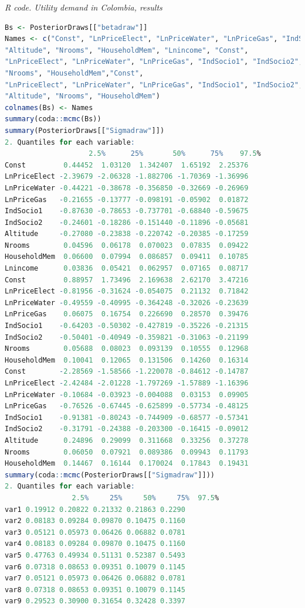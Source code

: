 \begin{tcolorbox}[enhanced,width=4.67in,center upper,
	fontupper=\large\bfseries,drop shadow southwest,sharp corners]
	\textit{R code. Utility demand in Colombia, results}
	\begin{VF}
		\begin{lstlisting}[language=R]
Bs <- PosteriorDraws[["betadraw"]]
Names <- c("Const", "LnPriceElect", "LnPriceWater", "LnPriceGas", "IndSocio1", "IndSocio2", 
"Altitude", "Nrooms", "HouseholdMem", "Lnincome", "Const",
"LnPriceElect", "LnPriceWater", "LnPriceGas", "IndSocio1", "IndSocio2", 
"Nrooms", "HouseholdMem","Const",
"LnPriceElect", "LnPriceWater", "LnPriceGas", "IndSocio1", "IndSocio2", 
"Altitude", "Nrooms", "HouseholdMem")
colnames(Bs) <- Names
summary(coda::mcmc(Bs))
summary(PosteriorDraws[["Sigmadraw"]])
2. Quantiles for each variable:
					2.5%      25%       50%      75%    97.5%
Const         0.44452  1.03120  1.342407  1.65192  2.25376
LnPriceElect -2.39679 -2.06328 -1.882706 -1.70369 -1.36996
LnPriceWater -0.44221 -0.38678 -0.356850 -0.32669 -0.26969
LnPriceGas   -0.21655 -0.13777 -0.098191 -0.05902  0.01872
IndSocio1    -0.87630 -0.78653 -0.737701 -0.68840 -0.59675
IndSocio2    -0.24601 -0.18286 -0.151440 -0.11896 -0.05681
Altitude     -0.27080 -0.23838 -0.220742 -0.20385 -0.17259
Nrooms        0.04596  0.06178  0.070023  0.07835  0.09422
HouseholdMem  0.06600  0.07994  0.086857  0.09411  0.10785
Lnincome      0.03836  0.05421  0.062957  0.07165  0.08717
Const         0.88957  1.73496  2.169638  2.62170  3.47216
LnPriceElect -0.81956 -0.31624 -0.054075  0.21132  0.71842
LnPriceWater -0.49559 -0.40995 -0.364248 -0.32026 -0.23639
LnPriceGas    0.06075  0.16754  0.226690  0.28570  0.39476
IndSocio1    -0.64203 -0.50302 -0.427819 -0.35226 -0.21315
IndSocio2    -0.50401 -0.40949 -0.359821 -0.31063 -0.21199
Nrooms        0.05688  0.08023  0.093139  0.10555  0.12968
HouseholdMem  0.10041  0.12065  0.131506  0.14260  0.16314
Const        -2.28569 -1.58566 -1.220078 -0.84612 -0.14787
LnPriceElect -2.42484 -2.01228 -1.797269 -1.57889 -1.16396
LnPriceWater -0.10684 -0.03923 -0.004088  0.03153  0.09905
LnPriceGas   -0.76526 -0.67445 -0.625899 -0.57734 -0.48125
IndSocio1    -0.91381 -0.80243 -0.744909 -0.68577 -0.57341
IndSocio2    -0.31791 -0.24388 -0.203300 -0.16415 -0.09012
Altitude      0.24896  0.29099  0.311668  0.33256  0.37278
Nrooms        0.06050  0.07921  0.089386  0.09943  0.11793
HouseholdMem  0.14467  0.16144  0.170024  0.17843  0.19431
summary(coda::mcmc(PosteriorDraws[["Sigmadraw"]]))
2. Quantiles for each variable:
				2.5%     25%     50%     75%  97.5%
var1 0.19912 0.20822 0.21332 0.21863 0.2290
var2 0.08183 0.09284 0.09870 0.10475 0.1160
var3 0.05121 0.05973 0.06426 0.06882 0.0781
var4 0.08183 0.09284 0.09870 0.10475 0.1160
var5 0.47763 0.49934 0.51131 0.52387 0.5493
var6 0.07318 0.08653 0.09351 0.10079 0.1145
var7 0.05121 0.05973 0.06426 0.06882 0.0781
var8 0.07318 0.08653 0.09351 0.10079 0.1145
var9 0.29523 0.30900 0.31654 0.32428 0.3397
\end{lstlisting}
	\end{VF}
\end{tcolorbox}

